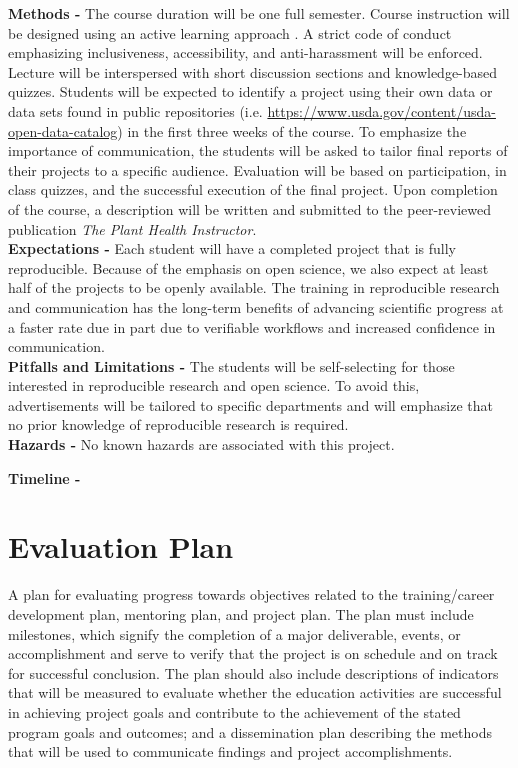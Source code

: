 \documentclass[12pt,letterpaper]{article}
\begin{document}
\noindent \textbf{Methods -}
The course duration will be one full semester. 
Course instruction will be designed using an active learning approach \citep{freeman2014active}.
A strict code of conduct emphasizing inclusiveness, accessibility, and anti-harassment will be enforced.
Lecture will be interspersed with short discussion sections and knowledge-based quizzes.
Students will be expected to identify a project using their own data or data sets found in public repositories (i.e. \url{https://www.usda.gov/content/usda-open-data-catalog}) in the first three weeks of the course.
To emphasize the importance of communication, the students will be asked to tailor final reports of their projects to a specific audience.
Evaluation will be based on participation, in class quizzes, and the successful execution of the final project.
Upon completion of the course, a description will be written and submitted to the peer-reviewed publication \textit{The Plant Health Instructor}.\\
\noindent \textbf{Expectations -}
Each student will have a completed project that is fully reproducible. 
Because of the emphasis on open science, we also expect at least half of the projects to be openly available.
The training in reproducible research and communication has the long-term benefits of advancing scientific progress at a faster rate due in part due to verifiable workflows and increased confidence in communication.\\
\noindent \textbf{Pitfalls and Limitations -}
The students will be self-selecting for those interested in reproducible research and open science.
To avoid this, advertisements will be tailored to specific departments and will emphasize that no prior knowledge of reproducible research is required.\\

\noindent \textbf{Hazards -} No known hazards are associated with this project.

\noindent \textbf{Timeline - }


\section{Evaluation Plan}

A plan for evaluating progress towards objectives related to the
training/career development plan, mentoring plan, and project plan. The plan
must include milestones, which signify the completion of a major deliverable,
events, or accomplishment and serve to verify that the project is on schedule
and on track for successful conclusion. The plan should also include
descriptions of indicators that will be measured to evaluate whether the
education activities are successful in achieving project goals and contribute
to the achievement of the stated program goals and outcomes; and a
dissemination plan describing the methods that will be used to communicate
findings and project accomplishments.
\end{document}
